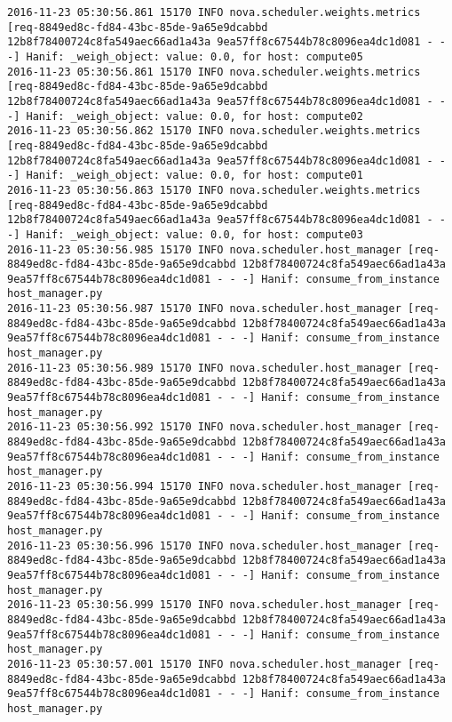 \begin{lstlisting}[frame=single, caption={The cPlex based scheduler log trace for 10 virtual instances}, label={lst:tucschedulercodetracelog10vi}, escapechar=|]
2016-11-23 05:30:56.861 15170 INFO nova.scheduler.weights.metrics [req-8849ed8c-fd84-43bc-85de-9a65e9dcabbd 12b8f78400724c8fa549aec66ad1a43a 9ea57ff8c67544b78c8096ea4dc1d081 - - -] Hanif: _weigh_object: value: 0.0, for host: compute05
2016-11-23 05:30:56.861 15170 INFO nova.scheduler.weights.metrics [req-8849ed8c-fd84-43bc-85de-9a65e9dcabbd 12b8f78400724c8fa549aec66ad1a43a 9ea57ff8c67544b78c8096ea4dc1d081 - - -] Hanif: _weigh_object: value: 0.0, for host: compute02
2016-11-23 05:30:56.862 15170 INFO nova.scheduler.weights.metrics [req-8849ed8c-fd84-43bc-85de-9a65e9dcabbd 12b8f78400724c8fa549aec66ad1a43a 9ea57ff8c67544b78c8096ea4dc1d081 - - -] Hanif: _weigh_object: value: 0.0, for host: compute01
2016-11-23 05:30:56.863 15170 INFO nova.scheduler.weights.metrics [req-8849ed8c-fd84-43bc-85de-9a65e9dcabbd 12b8f78400724c8fa549aec66ad1a43a 9ea57ff8c67544b78c8096ea4dc1d081 - - -] Hanif: _weigh_object: value: 0.0, for host: compute03
2016-11-23 05:30:56.985 15170 INFO nova.scheduler.host_manager [req-8849ed8c-fd84-43bc-85de-9a65e9dcabbd 12b8f78400724c8fa549aec66ad1a43a 9ea57ff8c67544b78c8096ea4dc1d081 - - -] Hanif: consume_from_instance host_manager.py
2016-11-23 05:30:56.987 15170 INFO nova.scheduler.host_manager [req-8849ed8c-fd84-43bc-85de-9a65e9dcabbd 12b8f78400724c8fa549aec66ad1a43a 9ea57ff8c67544b78c8096ea4dc1d081 - - -] Hanif: consume_from_instance host_manager.py
2016-11-23 05:30:56.989 15170 INFO nova.scheduler.host_manager [req-8849ed8c-fd84-43bc-85de-9a65e9dcabbd 12b8f78400724c8fa549aec66ad1a43a 9ea57ff8c67544b78c8096ea4dc1d081 - - -] Hanif: consume_from_instance host_manager.py
2016-11-23 05:30:56.992 15170 INFO nova.scheduler.host_manager [req-8849ed8c-fd84-43bc-85de-9a65e9dcabbd 12b8f78400724c8fa549aec66ad1a43a 9ea57ff8c67544b78c8096ea4dc1d081 - - -] Hanif: consume_from_instance host_manager.py
2016-11-23 05:30:56.994 15170 INFO nova.scheduler.host_manager [req-8849ed8c-fd84-43bc-85de-9a65e9dcabbd 12b8f78400724c8fa549aec66ad1a43a 9ea57ff8c67544b78c8096ea4dc1d081 - - -] Hanif: consume_from_instance host_manager.py
2016-11-23 05:30:56.996 15170 INFO nova.scheduler.host_manager [req-8849ed8c-fd84-43bc-85de-9a65e9dcabbd 12b8f78400724c8fa549aec66ad1a43a 9ea57ff8c67544b78c8096ea4dc1d081 - - -] Hanif: consume_from_instance host_manager.py
2016-11-23 05:30:56.999 15170 INFO nova.scheduler.host_manager [req-8849ed8c-fd84-43bc-85de-9a65e9dcabbd 12b8f78400724c8fa549aec66ad1a43a 9ea57ff8c67544b78c8096ea4dc1d081 - - -] Hanif: consume_from_instance host_manager.py
2016-11-23 05:30:57.001 15170 INFO nova.scheduler.host_manager [req-8849ed8c-fd84-43bc-85de-9a65e9dcabbd 12b8f78400724c8fa549aec66ad1a43a 9ea57ff8c67544b78c8096ea4dc1d081 - - -] Hanif: consume_from_instance host_manager.py

\end{lstlisting}
